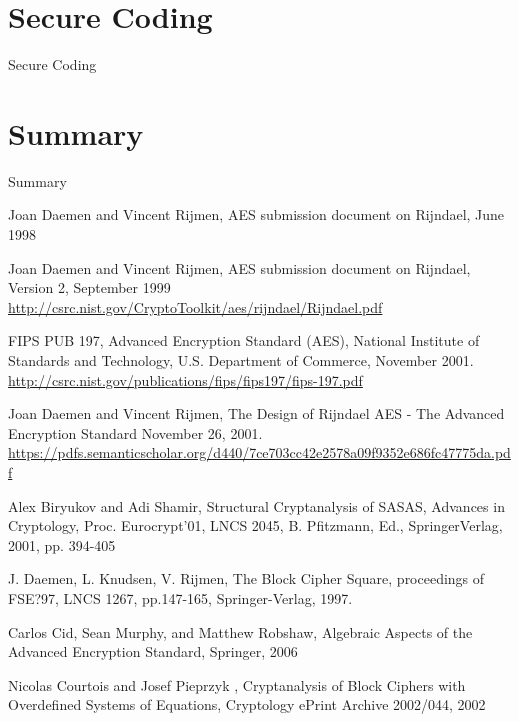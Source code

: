 \documentclass[twoside]{article}
\begin{document}

\section{Secure Coding}
Secure Coding

\section{Summary}
Summary


\begin{thebibliography}{99} 

Joan Daemen and Vincent Rijmen, AES submission document on Rijndael, June 1998

Joan Daemen and Vincent Rijmen, AES submission document on Rijndael, Version 2, September 1999
\newblock \url{http://csrc.nist.gov/CryptoToolkit/aes/rijndael/Rijndael.pdf}

FIPS PUB 197, Advanced Encryption Standard (AES), National Institute of Standards and Technology, U.S. Department of Commerce, November 2001.
\newblock \url{http://csrc.nist.gov/publications/fips/fips197/fips-197.pdf}

Joan Daemen and Vincent Rijmen, The Design of Rijndael AES - The Advanced Encryption Standard November 26, 2001.
\newblock \url{https://pdfs.semanticscholar.org/d440/7ce703cc42e2578a09f9352e686fc47775da.pdf}

Alex Biryukov and Adi Shamir, Structural Cryptanalysis of SASAS, Advances in Cryptology, Proc. Eurocrypt'01, LNCS 2045, B. Pfitzmann, Ed., SpringerVerlag, 2001, pp. 394-405

J. Daemen, L. Knudsen, V. Rijmen, The Block Cipher Square, proceedings of FSE?97, LNCS 1267, pp.147-165, Springer-Verlag, 1997.

Carlos Cid, Sean Murphy, and Matthew Robshaw, Algebraic Aspects of the Advanced Encryption Standard, Springer, 2006

Nicolas Courtois and Josef Pieprzyk , Cryptanalysis of Block Ciphers with Overdefined Systems of Equations, Cryptology ePrint Archive 2002/044, 2002


\end{thebibliography}
\end{document}
